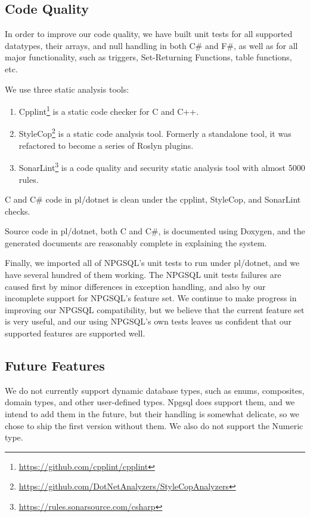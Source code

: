 \documentclass[sigconf,techreport,authorversion,nonacm]{acmart}
\begin{document}
\subsection{Code Quality}

In order to improve our code quality, we have built unit tests for all
supported datatypes, their arrays, and null handling in both C\# and F\#,
as well as for all major functionality, such as triggers, Set-Returning
Functions, table functions, etc.

We use three static analysis tools:
\begin{enumerate}[itemsep=0pt]
        \item Cpplint\footnote{\url{ https://github.com/cpplint/cpplint}} is a static code checker for C and C++.
        \item StyleCop\footnote{\url{ https://github.com/DotNetAnalyzers/StyleCopAnalyzers}} is a static code analysis tool. Formerly a standalone tool, it was refactored to become a series of Roslyn plugins.
        \item SonarLint\footnote{\url{ https://rules.sonarsource.com/csharp}} is a code quality and security static analysis tool with almost 5000 rules.
\end{enumerate}

C and C\# code in pl/dotnet is clean under the cpplint, StyleCop, and
SonarLint checks.

Source code in pl/dotnet, both C and C\#, is documented using Doxygen,
and the generated documents are reasonably complete in explaining
the system.

Finally, we imported all of NPGSQL's unit tests to run under
pl/dotnet, and we have several hundred of them working.  The NPGSQL
unit tests failures are caused first by minor differences in exception
handling, and also by our incomplete support for NPGSQL's feature
set.  We continue to make progress in improving our NPGSQL
compatibility, but we believe that the current feature set is very
useful, and our using NPGSQL's own tests leaves us confident that
our supported features are supported well.

\subsection{Future Features}

We do not currently support dynamic database types, such as enums,
composites, domain types, and other user-defined types. Npgsql
does support them, and we intend to add them in the future, but
their handling is somewhat delicate, so we chose to ship the first
version without them.  We also do not support the Numeric type.
\end{document}
